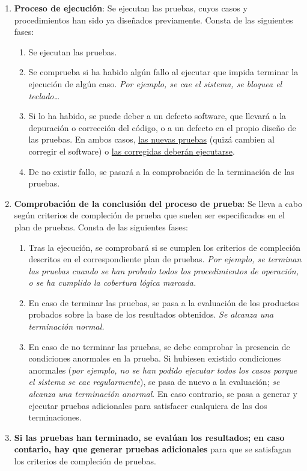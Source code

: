 \begin{enumerate}
    \item \textbf{Proceso de ejecución}: Se ejecutan las pruebas, cuyos casos y procedimientos han sido ya diseñados previamente. Consta de las siguientes fases:
    \begin{enumerate}
        \item Se ejecutan las pruebas.
        \item Se comprueba si ha habido algún fallo al ejecutar que impida terminar la ejecución de algún caso. \textit{Por ejemplo, se cae el sistema, se bloquea el teclado\ldots}
        \item Si lo ha habido, se puede deber a un defecto software, que llevará a la depuración o corrección del código, o a un defecto en el propio diseño de las pruebas. En ambos casos, \uline{las nuevas pruebas} (quizá cambien al corregir el software) o \uline{las corregidas deberán ejecutarse}.
        \item De no existir fallo, se pasará a la comprobación de la terminación de las pruebas.
    \end{enumerate}

    \item \textbf{Comprobación de la conclusión del proceso de prueba}: Se lleva a cabo según criterios de compleción de prueba que suelen ser especificados en el plan de pruebas. Consta de las siguientes fases:
    \begin{enumerate}
        \item Tras la ejecución, se comprobará si se cumplen los criterios de compleción descritos en el correspondiente plan de pruebas. \textit{Por ejemplo, se terminan las pruebas cuando se han probado todos los procedimientos de operación, o se ha cumplido la cobertura lógica marcada.}
        \item En caso de terminar las pruebas, se pasa a la evaluación de los productos probados sobre la base de los resultados obtenidos. \textit{Se alcanza una terminación normal.}
        \item En caso de no terminar las pruebas, se debe comprobar la presencia de condiciones anormales en la prueba. Si hubiesen existido condiciones anormales (\textit{por ejemplo, no se han podido ejecutar todos los casos porque el sistema se cae regularmente}), se pasa de nuevo a la evaluación; \textit{se alcanza una terminación anormal}. En caso contrario, se pasa a generar y ejecutar pruebas adicionales para satisfacer cualquiera de las dos terminaciones.
    \end{enumerate}
    \item \textbf{Si las pruebas han terminado, se evalúan los resultados; en caso contario, hay que generar pruebas adicionales} para que se satisfagan los criterios de compleción de pruebas.
\end{enumerate}

